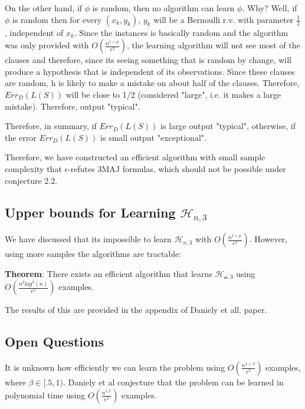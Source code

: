 \documentclass[11pt,a4paper]{article}
\begin{document}
On the other hand, if $\phi$ is random, then no algorithm can learn $\phi$. Why? Well, if $\phi$ is random then for every $(x_k, y_k)$, $y_k$ will be a Bernoulli r.v. with parameter $\frac{1}{2}$, independent of $x_k$. Since the instances is basically random and the algorithm was only provided with $O(\frac{n^{1+\mu}}{\epsilon^2} )$, the learning algorithm will not see most of the clauses and therefore, since its seeing something that is random by change, will produce a hypothesis that is independent of its observations. Since these clauses are random, h is likely to make a mistake on about half of the clauses. Therefore, $Err_{D}(L(S))$ will be close to 1/2 (considered "large", i.e. it makes a large mistake). Therefore, output "typical".

Therefore, in summary, if $Err_{D}(L(S))$ is large output "typical", otherwise, if the error $Err_{D}(L(S))$ is small output "exceptional".

Therefore, we have constructed an efficient algorithm with small sample complexity that $\epsilon$-refutes 3MAJ formulas, which should not be possible under conjecture 2.2.

\subsection{Upper bounds for Learning $\mathcal{H}_{n,3}$}

We have discussed that its impossible to learn $\mathcal{H}_{n,3}$ with $O(\frac{n^{1+\mu}}{\epsilon^2} )$. However, using more samples the algorithms are tractable:

\textbf{Theorem}: There exists an efficient algorithm that learns $\mathcal{H_{n,3}}$ using $O(\frac{n^{2} log^3(n)}{\epsilon^2} )$ examples.

The results of this are provided in the appendix of Daniely et all. paper.

\subsection{Open Questions}

It is unknown how efficiently we can learn the problem using $O(\frac{n^{1 + \beta}}{\epsilon^2})$ examples, where $\beta \in [.5, 1)$. Daniely et al conjecture that the problem can be learned in polynomial time using $O(\frac{n^{1.5}}{\epsilon^2})$ examples.
\end{document}
